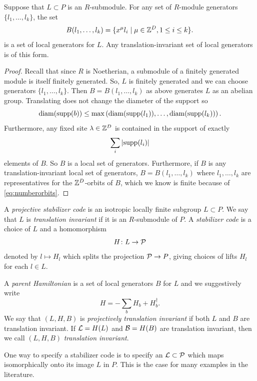\documentclass[11pt]{amsart}
\begin{document}
\begin{lem}
Suppose that $L\subset P$ is an $R$-submodule. For any set of $R$-module generators $\{l_1,\ldots, l_k\}$, the set
\[B(l_1,\ldots, l_k)= \{ x^\mu l_i \mid \mu \in \mathbb{Z}^D, 1 \leq i \leq k \}. \]
is a set of local generators for $L$. Any translation-invariant set of local generators is of this form.
\end{lem}
\begin{proof}
Recall that since $R$ is Noetherian, a submodule of a finitely generated module is itself finitely generated. So, $L$ is finitely generated and we can choose generators $\{l_1,\ldots, l_k\}$. Then $B = B(l_1,\ldots, l_k)$ as above generates $L$ as an abelian group. Translating does not change the diameter of the support so
\[\mathrm{diam}(\mathrm{supp}(b)) \leq \max \left(\mathrm{diam}(\mathrm{supp}(l_1)),\ldots,\mathrm{diam}(\mathrm{supp}(l_k))\right).\]
 Furthermore, any fixed site $\lambda \in \mathbb{Z}^D$ is contained in the support of exactly
 \begin{align} \label{eq:numberorbits}
 \sum_{i} |\mathrm{supp}(l_i)|
 \end{align}
 elements of $B$. So $B$ is a local set of generators. Furthermore, if $B$ is any translation-invariant local set of generators,  $B =B(l_1, \ldots, l_k)$ where $l_1, \ldots, l_k$ are representatives for the $\mathbb{Z}^D$-orbits of $B$, which we know is finite because of \eqref{eq:numberorbits}.
\end{proof}



\begin{defn}
A \emph{projective stabilizer code} is an isotropic locally finite subgroup $L \subset P$. We say that $L$ is \emph{translation invariant} if it is an $R$-submodule of $P$.  A \emph{stabilizer code} is a choice of $L$ and a homomorphism
\[ H \colon L \to \mathcal{P}\]
denoted by $l\mapsto H_l$ which splits the projection $\mathcal{P} \to P$, giving choices of lifts $H_l$ for each $l\in L$.

A \emph{parent Hamiltonian} is a set of local generators $B$ for $L$ and we suggestively write
\[ H= -\sum_b H_b+H_b^\dagger .\]
We say that $(L,H,B)$ is \emph{projectively translation invariant} if both $L$ and $B$ are translation invariant. If $\mathcal{L} = H(L)$ and $\mathcal{B}=H(B)$ are translation invariant, then we call   $(L,H,B)$ \emph{translation invariant}.
\end{defn}





One way to specify a stabilizer code is to specify an $\mathcal{L} \subset \mathcal{P}$ which maps isomorphically onto its image $L$ in $P$. This is the case for many examples in the literature.
\end{document}
